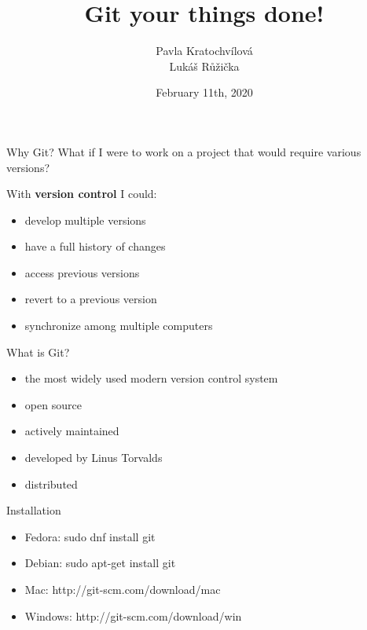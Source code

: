 \documentclass[14pt]{beamer}
\begin{document}
	\author{Pavla Kratochvílová \\ Lukáš Růžička}
	\title{Git your things done!}
	\date{February 11th, 2020}
	\begin{frame}[plain]
		\maketitle
	\end{frame}

	\begin{frame}{Why Git?}
		What if I were to work on a project that would require various versions? 
		
		With \textbf{version control} I could:
		
		\vspace{5pt}
		
	\begin{itemize}
		\item develop multiple versions
		\item have a full history of changes
		\item access previous versions
		\item revert to a previous version
		\item synchronize among multiple computers
	\end{itemize}
\end{frame}

	\begin{frame}{What is Git?}
		\begin{itemize}
		\item the most widely used modern version control system
		\item open source
		\item actively maintained
		\item developed by Linus Torvalds
		\item distributed 
		\end{itemize}
	\end{frame}

	\begin{frame}{Installation}
		\begin{itemize}
		\item Fedora: sudo dnf install git
		\item Debian: sudo apt-get install git
		\item Mac: http://git-scm.com/download/mac
		\item Windows: http://git-scm.com/download/win
		\end{itemize}
	\end{frame}
\end{document}
